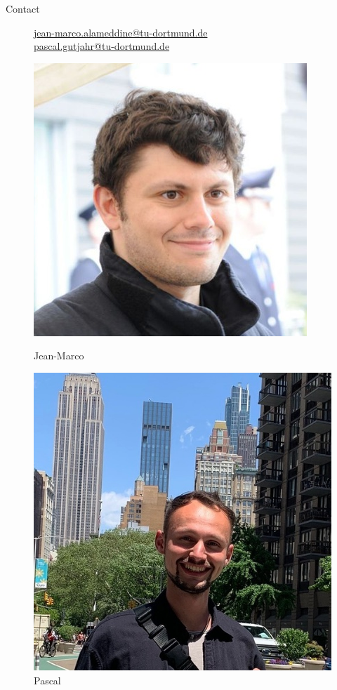 \documentclass[t]{beamer}
\begin{document}
\begin{columns}[onlytextwidth]
\begin{column}{0.4\textwidth}
\begin{block}[equal height group=Z]{Contact}
\begin{center}
\begin{figure}[ht]
\begin{minipage}[ht]{0.5\linewidth}
              \vspace{0.25em}
              \href{mailto:me@jean-marco.alameddine@tu-dortmund.de}{jean-marco.alameddine@tu-dortmund.de} 
              \\ \href{mailto:me@pascal.gutjahr@tu-dortmund.de}{pascal.gutjahr@tu-dortmund.de} 
            \end{minipage}
            \begin{minipage}[ht]{0.24\linewidth}
              \centering
                \includegraphics[width=0.61\linewidth, valign=t]{plots/ich.png}
                \caption*{\footnotesize Jean-Marco}
            \end{minipage}
              \begin{minipage}[ht]{0.24\linewidth}
              \centering
                \includegraphics[width=0.61\linewidth, valign=t]{plots/pascal.jpg}
                \caption*{\footnotesize Pascal}
            \end{minipage}
          \end{figure}
        \end{center}
      \end{block}
    \end{column}
    \end{columns}
\end{document}
